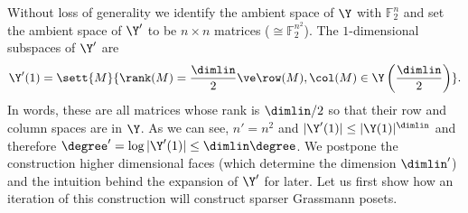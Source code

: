 Without loss of generality we identify the ambient space of \(\Y\) with \(\mathbb{F}_2^{n}\) and set the ambient space of \(\Y'\) to be \(n \times n\) matrices (\(\cong \mathbb{F}_2^{n^2}\)). The \(1\)-dimensional subspaces of \(\Y'\) are
\begin{equation} \label{eq:dim-1-ss}
    \Y'(1) = \sett{M}{\rank(M) = \frac{\dimlin}{2} \ve \row(M), \col(M) \in \Y \left (\frac{\dimlin }{2} \right)}.
\end{equation}
In words, these are all matrices whose rank is \(\dimlin/2\) so that their row and column spaces are in \(\Y\). As we can see, \(n' = n^2\) and \(|\Y'(1)| \leq |\Y(1)|^\dimlin\) and therefore \(\degree'=\log |\Y'(1)| \leq \dimlin \degree\). We postpone the construction higher dimensional faces (which determine the dimension \(\dimlin '\)) and the intuition behind the expansion of \(\Y'\) for later. Let us first show how an iteration of this construction will construct sparser Grassmann posets.


